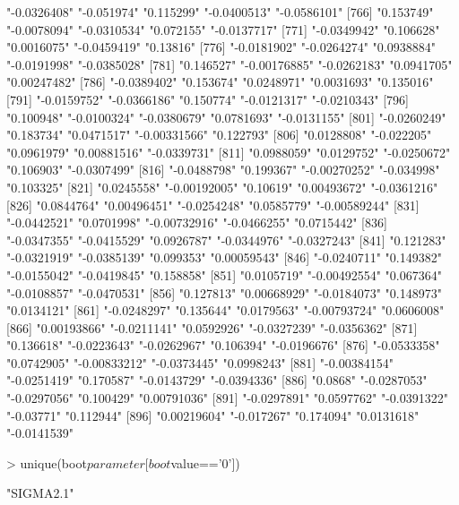 \begin{Schunk}
\begin{Soutput}
[761] "-0.0326408"   "-0.051974"    "0.115299"     "-0.0400513"   "-0.0586101"  
[766] "0.153749"     "-0.0078094"   "-0.0310534"   "0.072155"     "-0.0137717"  
[771] "-0.0349942"   "0.106628"     "0.0016075"    "-0.0459419"   "0.13816"     
[776] "-0.0181902"   "-0.0264274"   "0.0938884"    "-0.0191998"   "-0.0385028"  
[781] "0.146527"     "-0.00176885"  "-0.0262183"   "0.0941705"    "0.00247482"  
[786] "-0.0389402"   "0.153674"     "0.0248971"    "0.0031693"    "0.135016"    
[791] "-0.0159752"   "-0.0366186"   "0.150774"     "-0.0121317"   "-0.0210343"  
[796] "0.100948"     "-0.0100324"   "-0.0380679"   "0.0781693"    "-0.0131155"  
[801] "-0.0260249"   "0.183734"     "0.0471517"    "-0.00331566"  "0.122793"    
[806] "0.0128808"    "-0.022205"    "0.0961979"    "0.00881516"   "-0.0339731"  
[811] "0.0988059"    "0.0129752"    "-0.0250672"   "0.106903"     "-0.0307499"  
[816] "-0.0488798"   "0.199367"     "-0.00270252"  "-0.034998"    "0.103325"    
[821] "0.0245558"    "-0.00192005"  "0.10619"      "0.00493672"   "-0.0361216"  
[826] "0.0844764"    "0.00496451"   "-0.0254248"   "0.0585779"    "-0.00589244" 
[831] "-0.0442521"   "0.0701998"    "-0.00732916"  "-0.0466255"   "0.0715442"   
[836] "-0.0347355"   "-0.0415529"   "0.0926787"    "-0.0344976"   "-0.0327243"  
[841] "0.121283"     "-0.0321919"   "-0.0385139"   "0.099353"     "0.00059543"  
[846] "-0.0240711"   "0.149382"     "-0.0155042"   "-0.0419845"   "0.158858"    
[851] "0.0105719"    "-0.00492554"  "0.067364"     "-0.0108857"   "-0.0470531"  
[856] "0.127813"     "0.00668929"   "-0.0184073"   "0.148973"     "0.0134121"   
[861] "-0.0248297"   "0.135644"     "0.0179563"    "-0.00793724"  "0.0606008"   
[866] "0.00193866"   "-0.0211141"   "0.0592926"    "-0.0327239"   "-0.0356362"  
[871] "0.136618"     "-0.0223643"   "-0.0262967"   "0.106394"     "-0.0196676"  
[876] "-0.0533358"   "0.0742905"    "-0.00833212"  "-0.0373445"   "0.0998243"   
[881] "-0.00384154"  "-0.0251419"   "0.170587"     "-0.0143729"   "-0.0394336"  
[886] "0.0868"       "-0.0287053"   "-0.0297056"   "0.100429"     "0.00791036"  
[891] "-0.0297891"   "0.0597762"    "-0.0391322"   "-0.03771"     "0.112944"    
[896] "0.00219604"   "-0.017267"    "0.174094"     "0.0131618"    "-0.0141539"  
\end{Soutput}
\begin{Sinput}
> unique(boot$parameter[boot$value=='0'])
\end{Sinput}
\begin{Soutput}
[1] "SIGMA2.1"
\end{Soutput}
\end{Schunk}
